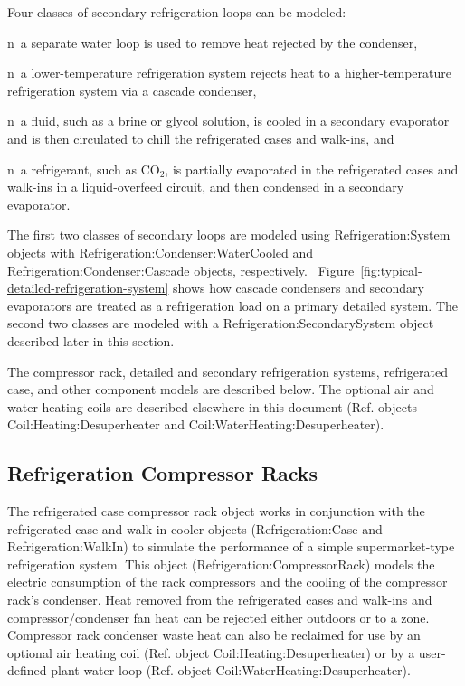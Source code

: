 Four classes of secondary refrigeration loops can be modeled:

n~a separate water loop is used to remove heat rejected by the condenser,

n~a lower-temperature refrigeration system rejects heat to a higher-temperature refrigeration system via a cascade condenser,

n~a fluid, such as a brine or glycol solution, is cooled in a secondary evaporator and is then circulated to chill the refrigerated cases and walk-ins, and

n~a refrigerant, such as CO\(_{2}\), is partially evaporated in the refrigerated cases and walk-ins in a liquid-overfeed circuit, and then condensed in a secondary evaporator.

The first two classes of secondary loops are modeled using Refrigeration:System objects with Refrigeration:Condenser:WaterCooled and Refrigeration:Condenser:Cascade objects, respectively.~ Figure~\ref{fig:typical-detailed-refrigeration-system} shows how cascade condensers and secondary evaporators are treated as a refrigeration load on a primary detailed system. The second two classes are modeled with a Refrigeration:SecondarySystem object described later in this section.

The compressor rack, detailed and secondary refrigeration systems, refrigerated case, and other component models are described below. The optional air and water heating coils are described elsewhere in this document (Ref. objects Coil:Heating:Desuperheater and Coil:WaterHeating:Desuperheater).

\subsection{Refrigeration Compressor Racks}\label{refrigeration-compressor-racks}

The refrigerated case compressor rack object works in conjunction with the refrigerated case and walk-in cooler objects (Refrigeration:Case and Refrigeration:WalkIn) to simulate the performance of a simple supermarket-type refrigeration system. This object (Refrigeration:CompressorRack) models the electric consumption of the rack compressors and the cooling of the compressor rack's condenser. Heat removed from the refrigerated cases and walk-ins and compressor/condenser fan heat can be rejected either outdoors or to a zone. Compressor rack condenser waste heat can also be reclaimed for use by an optional air heating coil (Ref. object Coil:Heating:Desuperheater) or by a user-defined plant water loop (Ref. object Coil:WaterHeating:Desuperheater).


